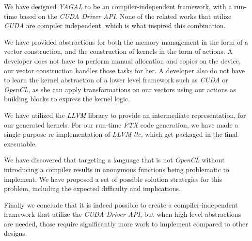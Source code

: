 We have designed \textit{YAGAL} to be an compiler-independent framework, with a run-time based on the \textit{CUDA Driver API}. None of the related works that utilize \textit{CUDA} are compiler independent, which is what inspired this combination.

We have provided abstractions for both the memory management in the form of a vector construction, and the construction of kernels in the form of actions. A developer does not have to perform manual allocation and copies on the device, our vector construction handles those tasks for her. A developer also do not have to learn the kernel abstraction of a lower level framework such as \textit{CUDA} or \textit{OpenCL}, as she can apply transformations on our vectors using our actions as building blocks to express the kernel logic.

We have utilized the \textit{LLVM} library to provide an intermediate representation, for our generated kernels. For our run-time \textit{PTX} code generation, we have made a single purpose re-implementation of \textit{LLVM llc}, which get packaged in the final executable.

We have discovered that targeting a language that is not \textit{OpenCL} without introducing a compiler results in anonymous functions being problematic to implement. We have proposed a set of possible solution strategies for this problem, including the expected difficulty and implications.

Finally we conclude that it is indeed possible to create a compiler-independent framework that utilize the \textit{CUDA Driver API}, but when high level abstractions are needed, those require significantly more work to implement compared to other designs.
